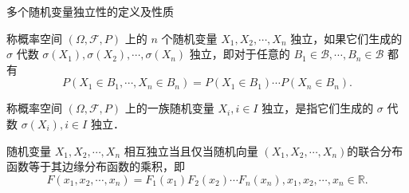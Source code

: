 \documentclass[Prob-All.tex]{subfiles}
\begin{document}
\begin{frame}{多个随机变量独立性的定义及性质}
\begin{defi}
称概率空间 $(\Omega, \mathcal{F}, P)$ 上的 $n$ 个随机变量 $X_{1}, X_{2}, \cdots, X_{n}$ 独立，如果它们生成的 $\sigma$ 代数 $\sigma\left(X_{1}\right), \sigma\left(X_{2}\right), \cdots, \sigma\left(X_{n}\right)$ 独立，即对于任意的 $B_{1} \in \mathcal{B}, \cdots, B_{n} \in \mathcal{B}$ 都有
\[
P\left(X_{1} \in B_{1}, \cdots, X_{n} \in B_{n}\right)=P\left(X_{1} \in B_{1}\right)  \cdots P\left(X_{n} \in B_{n}\right).%
\]%
\end{defi}%
\pause
\begin{defi}
  称概率空间 $(\Omega, \mathcal{F}, P)$ 上的一族随机变量 $X_{i}, i \in I$ 独立，是指它们生成的 $\sigma$ 代数 $\sigma\left(X_{i}\right), i \in I$ 独立．
\end{defi}

\pause
\vspace{0.5cm}
\begin{thm}
随机变量 $X_{1}, X_{2}, \cdots, X_{n}$ 相互独立当且仅当随机向量 $\left(X_{1}, X_{2}, \cdots, X_{n}\right)$的联合分布函数等于其边缘分布函数的乘积，即
\[
F\left(x_{1}, x_{2}, \cdots, x_{n}\right)=F_{1}\left(x_{1}\right) F_{2}\left(x_{2}\right) \cdots F_{n}\left(x_{n}\right),  x_{1}, x_{2}, \cdots, x_{n} \in \mathbb{R} .
\]
\end{thm}

\end{frame}
\end{document}
